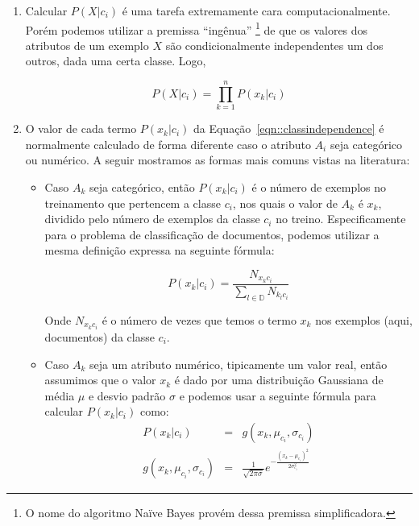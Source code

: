 \begin{enumerate}
    \item Calcular $P(X|c_i)$ é uma tarefa extremamente cara computacionalmente. Porém podemos utilizar a premissa ``ingênua'' \footnote{O nome do algoritmo Naïve Bayes provém dessa premissa simplificadora.} de que os valores dos atributos de um exemplo $X$ são condicionalmente independentes um dos outros, dada uma certa classe. Logo,

\begin{equation}\label{eqn::classindependence}
   P(X|c_{i}) = \prod^{n}_{k=1}{P(x_k|c_i) }
\end{equation}

\item O valor de cada termo $P(x_k|c_i)$ da Equação~\ref{eqn::classindependence} é normalmente calculado de forma diferente caso o atributo $A_i$ seja categórico ou numérico. A seguir mostramos as formas mais comuns vistas na literatura:
    \begin{itemize}

        \item Caso $A_k$ seja categórico, então $P(x_k|c_i)$ é o número de exemplos no treinamento que pertencem a classe $c_i$, nos quais o valor de $A_k$ é $x_k$, dividido pelo número de exemplos da classe $c_i$ no treino. Especificamente para o problema de classificação de documentos, podemos utilizar a mesma definição expressa na seguinte fórmula:

    \begin{equation}\label{eqn::nbcattexto}
        P(x_k|c_i) = \frac{ N_{x_{k}c_{i}} }{ \sum_{l \in \mathbb{D}} { } N_{k_{l}c_{i}} } 
    \end{equation}

        Onde $N_{x_{k}c_{i}}$ é o número de vezes que temos o termo $x_k$ nos exemplos (aqui, documentos) da classe $c_i$. 

        \item Caso $A_k$ seja um atributo numérico, tipicamente um valor real, então assumimos que o valor $x_k$ é dado por uma distribuição Gaussiana de média $\mu$ e desvio padrão $\sigma$ e podemos usar a seguinte fórmula para calcular $P(x_k|c_i)$ como:
    \begin{eqnarray}\label{eqn::nbnumerico}
        P(x_k|c_i) & = & g(x_k, \mu_{c_i}, \sigma_{c_i})  \\
        g(x_k, \mu_{c_i}, \sigma_{c_i}) & = & \frac {1} { \sqrt{2\pi\sigma} } e^{ -\frac{(x_k-\mu_{c_i})^2}{2\sigma_{c_i}^2}  } 
    \end{eqnarray}
        

\end{itemize}
\end{enumerate}
